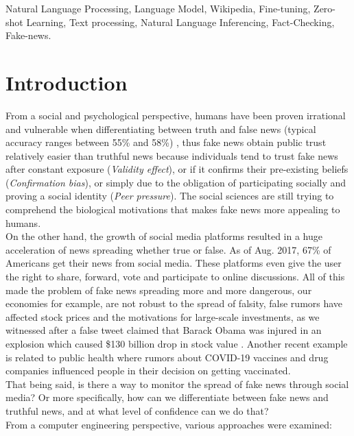 \documentclass[conference]{IEEEtran}
\begin{document}
\begin{IEEEkeywords}
Natural Language Processing, Language Model, Wikipedia, Fine-tuning, Zero-shot Learning, Text processing, Natural Language Inferencing, Fact-Checking, Fake-news.
\end{IEEEkeywords}

\section{Introduction}
From a social and psychological perspective, humans have been proven irrational and vulnerable when differentiating between truth and false news (typical accuracy ranges between 55\% and 58\%) \cite{zhou2019fake}, thus fake news obtain public trust relatively easier than truthful news because individuals tend to trust fake news after constant exposure (\textit{Validity effect}), or if it confirms their pre-existing beliefs (\textit{Confirmation bias}), or simply due to the obligation of participating socially and proving a social identity (\textit{Peer pressure}). The social sciences are still trying to comprehend the biological motivations that makes fake news more appealing to humans.\\

On the other hand, the growth of social media platforms resulted in a huge acceleration of news spreading whether true or false. As of Aug. 2017, 67\% \cite{zhou2019fake} of Americans get their news from social media. These platforms even give the user the right to share, forward, vote and participate to online discussions. All of this made the problem of fake news spreading more and more dangerous, our economies for example, are not robust to the spread of falsity, false rumors have affected stock prices and the motivations for large-scale investments, as we witnessed after a false tweet claimed that Barack Obama was injured in an explosion which caused \$130 billion drop in stock value \cite{vosoughi2018spread}. Another recent example is related to public health where rumors about COVID-19 vaccines and drug companies influenced people in their decision on getting vaccinated.\\

That being said, is there a way to monitor the spread of fake news through social media? Or more specifically, how can we differentiate between fake news and truthful news, and at what level of confidence can we do that?\\

From a computer engineering perspective, various approaches were examined:
\end{document}
